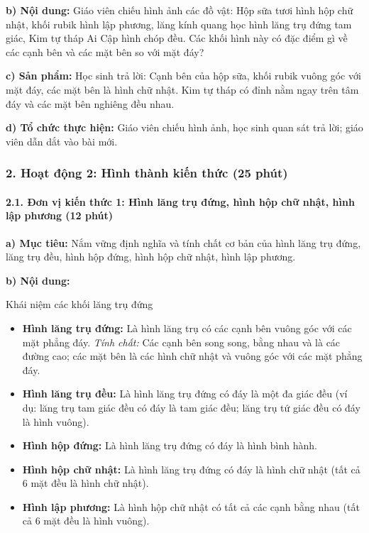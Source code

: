 \documentclass[12pt, a4paper]{article}
\begin{document}
\noindent \textbf{b) Nội dung:}
Giáo viên chiếu hình ảnh các đồ vật: Hộp sữa tươi hình hộp chữ nhật, khối rubik hình lập phương, lăng kính quang học hình lăng trụ đứng tam giác, Kim tự tháp Ai Cập hình chóp đều.
Các khối hình này có đặc điểm gì về các cạnh bên và các mặt bên so với mặt đáy?

\noindent \textbf{c) Sản phẩm:}
Học sinh trả lời: Cạnh bên của hộp sữa, khối rubik vuông góc với mặt đáy, các mặt bên là hình chữ nhật. Kim tự tháp có đỉnh nằm ngay trên tâm đáy và các mặt bên nghiêng đều nhau.

\noindent \textbf{d) Tổ chức thực hiện:}
Giáo viên chiếu hình ảnh, học sinh quan sát trả lời; giáo viên dẫn dắt vào bài mới.

\subsubsection*{2. Hoạt động 2: Hình thành kiến thức (25 phút)}

\paragraph{2.1. Đơn vị kiến thức 1: Hình lăng trụ đứng, hình hộp chữ nhật, hình lập phương (12 phút)}

\noindent \textbf{a) Mục tiêu:}
Nắm vững định nghĩa và tính chất cơ bản của hình lăng trụ đứng, lăng trụ đều, hình hộp đứng, hình hộp chữ nhật, hình lập phương.

\noindent \textbf{b) Nội dung:}
\begin{pedabox}{Khái niệm các khối lăng trụ đứng}
\begin{itemize}[leftmargin=0.6cm]
    \item \textbf{Hình lăng trụ đứng:} Là hình lăng trụ có các cạnh bên vuông góc với các mặt phẳng đáy.
    \textit{Tính chất:} Các cạnh bên song song, bằng nhau và là các đường cao; các mặt bên là các hình chữ nhật và vuông góc với các mặt phẳng đáy.
    \item \textbf{Hình lăng trụ đều:} Là hình lăng trụ đứng có đáy là một đa giác đều (ví dụ: lăng trụ tam giác đều có đáy là tam giác đều; lăng trụ tứ giác đều có đáy là hình vuông).
    \item \textbf{Hình hộp đứng:} Là hình lăng trụ đứng có đáy là hình bình hành.
    \item \textbf{Hình hộp chữ nhật:} Là hình lăng trụ đứng có đáy là hình chữ nhật (tất cả 6 mặt đều là hình chữ nhật).
    \item \textbf{Hình lập phương:} Là hình hộp chữ nhật có tất cả các cạnh bằng nhau (tất cả 6 mặt đều là hình vuông).
\end{itemize}
\end{pedabox}
\end{document}
